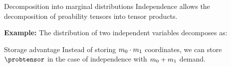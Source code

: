 \documentclass{beamer}
\begin{document}
    \begin{frame}{Decomposition into marginal distributions}
        Independence allows the decomposition of proability tensors into tensor products.
        \par
        {\bf Example:} The distribution of two independent variables decomposes as:
        \begin{center}
            
        \end{center}

        \begin{block}{Storage advantage}
            Instead of storing $m_{0}\cdot m_{1}$ coordinates, we can store $\probtensor$ in the case of independence with $m_{0}+m_{1}$ demand.
        \end{block}
    \end{frame}
\end{document}
